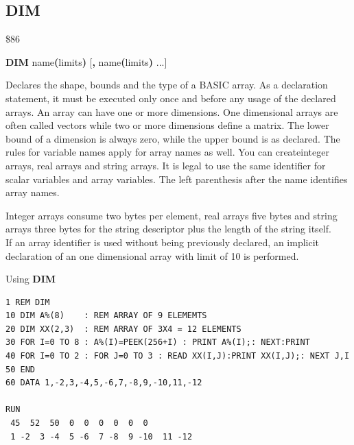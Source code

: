 \newpage
\subsection{DIM}
\begin{description}[leftmargin=2cm,style=nextline]
\item [Token:] \$86
\item [Format:] {\bf DIM} name{\bf(}limits{\bf)} [{\bf,} name{\bf(}limits{\bf)} ...]
\item [Usage:] Declares the shape,
               bounds and the type of a BASIC array.
               As a declaration statement, it must be executed
               only once and before any usage of the declared arrays.
               An array can have one or more dimensions.
               One dimensional arrays are often called vectors
               while two or more dimensions define a matrix.
               The lower bound of a dimension is always zero,
               while the upper bound is as declared. The rules for
               variable names apply for array names as well.
               You can createinteger arrays, real arrays and string arrays.
               It is legal to use the same identifier for scalar
               variables and array variables. The left parenthesis
               after the name identifies array names.

\item [Remarks:] Integer arrays consume two bytes per element,
                 real arrays five bytes and string arrays three bytes
                 for the string descriptor plus
                 the length of the string itself. \\
                 If an array identifier is used without being previously
                 declared, an implicit declaration of an
                 one dimensional array with limit of 10 is performed.

\item [Example:] Using {\bf DIM}
\begin{tcolorbox}[colback=black,coltext=white]
\verbatimfont{\codefont}
\begin{verbatim}
1 REM DIM
10 DIM A%(8)    : REM ARRAY OF 9 ELEMEMTS
20 DIM XX(2,3)  : REM ARRAY OF 3X4 = 12 ELEMENTS
30 FOR I=0 TO 8 : A%(I)=PEEK(256+I) : PRINT A%(I);: NEXT:PRINT
40 FOR I=0 TO 2 : FOR J=0 TO 3 : READ XX(I,J):PRINT XX(I,J);: NEXT J,I
50 END
60 DATA 1,-2,3,-4,5,-6,7,-8,9,-10,11,-12

RUN
 45  52  50  0  0  0  0  0  0
 1 -2  3 -4  5 -6  7 -8  9 -10  11 -12
\end{verbatim}
\end{tcolorbox}
\end{description}


